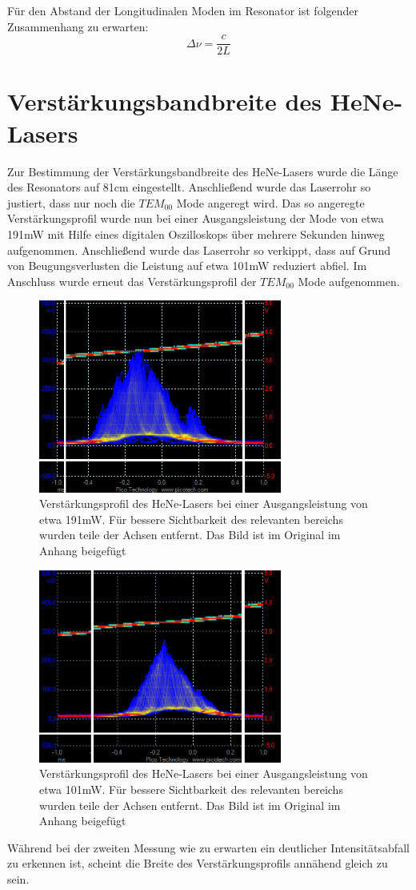 \documentclass[bigchapter,colorback,accentcolor=tud4b,linedtoc,11pt]{tudreport}
\numberwithin{equation}{subsection}
\begin{document}
Für den Abstand der Longitudinalen Moden im Resonator ist folgender Zusammenhang zu erwarten:
$$\Delta\nu=\frac{c}{2L}$$
\FloatBarrier
\newpage
\section{Verstärkungsbandbreite des HeNe-Lasers}
Zur Bestimmung der Verstärkungsbandbreite des HeNe-Lasers wurde die Länge des Resonators auf 81cm eingestellt. Anschließend wurde das Laserrohr so justiert, dass nur noch die $TEM_{00}$ Mode angeregt wird. Das so angeregte Verstärkungsprofil wurde nun bei einer Ausgangsleistung der Mode von etwa 191mW mit Hilfe eines digitalen Oszilloskops über mehrere Sekunden hinweg aufgenommen. Anschließend wurde das Laserrohr so verkippt, dass auf Grund von Beugungsverlusten die Leistung auf etwa 101mW reduziert abfiel. Im Anschluss wurde erneut das Verstärkungsprofil der $TEM_{00}$ Mode aufgenommen.

\begin{figure}[ht!]
\centering
\includegraphics[width=80mm]{Messdaten/81cm191mW4uW.png}
\caption{Verstärkungsprofil des HeNe-Lasers bei einer Ausgangsleistung von etwa 191mW. Für bessere Sichtbarkeit des relevanten bereichs wurden teile der Achsen entfernt. Das Bild ist im Original im Anhang beigefügt}
\label{HeNeBreite191mW}
\end{figure}
\begin{figure}[ht!]
\centering
\includegraphics[width=80mm]{Messdaten/81cm101mW4uW.png}
\caption{Verstärkungsprofil des HeNe-Lasers bei einer Ausgangsleistung von etwa 101mW. Für bessere Sichtbarkeit des relevanten bereichs wurden teile der Achsen entfernt. Das Bild ist im Original im Anhang beigefügt}
\label{HeNeBreite101mW}
\end{figure}
\FloatBarrier
Während bei der zweiten Messung wie zu erwarten ein deutlicher Intensitätsabfall zu erkennen ist, scheint die Breite des Verstärkungsprofils annähend gleich zu sein.
\end{document}
